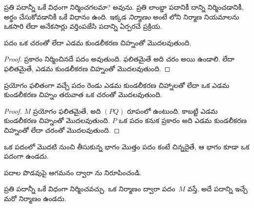 \documentclass[../../../include/open-logic-section]{subfiles}
\begin{document}

ప్రతి పదాన్నీ ఒకే విధంగా నిర్మించగలమా? అవును. ప్రతి లాంబ్డా పదానికీ
దాన్ని నిర్మించడానికీ, అర్థం చేసుకోవడానికీ ఒకే విధానం ఉంది. ఇక్కడ \emph{నిర్మాణం} అంటే
లోని నిర్మాణ నియమాలను ఒకసారి లేదా అనేకసార్లు
వర్తింపజేసి పదాన్ని ఏర్పరచే ప్రక్రియ.

\begin{lem}
పదం ఒక చరంతో లేదా ఎడమ కుండలీకరణ చిహ్నంతో మొదలవుతుంది.
\end{lem}

\begin{proof}
 ప్రకారం నిర్మించినదే పదం అవుతుంది.
 ఫలితమైతే అది చరం అయి ఉండాలి.
 లేదా  ఫలితమైతే,
ఎడమ కుండలీకరణ చిహ్నంతో మొదలవుతుంది.
\end{proof}

\begin{lem}
ప్రయోగం ఫలితంగా వచ్చే పదం రెండు ఎడమ కుండలీకరణ చిహ్నాలతో లేదా ఒక ఎడమ
కుండలీకరణ చిహ్నం తరువాత ఒక చరంతో మొదలవుతుంది.
\end{lem}

\begin{proof}
$M$ ప్రయోగం ఫలితమైతే, అది $(PQ)$ రూపంలో ఉంటుంది. కాబట్టి ఎడమ
కుండలీకరణ చిహ్నంతో మొదలవుతుంది. $P$ ఒక పదం కనుక
 ప్రకారం అది ఎడమ కుండలీకరణ చిహ్నంతో లేదా
చరంతో మొదలవుతుంది.
\end{proof}

\begin{lem}
ఒక పదంలో మొదటి నుంచి తీసుకున్న భాగం మొత్తం పదం కంటే చిన్నదైతే, ఆ భాగం కూడా ఒక పదంగా ఉండదు.
\end{lem}

\begin{prob}
పదాల పొడవుపై ఆగమనం ద్వారా
ను నిరూపించండి.
\end{prob}

\begin{prop}[ఏకార్థ పఠనీయత] 
ప్రతి పదాన్నీ ఒకే విధంగా నిర్మించవచ్చు. ఒక నిర్మాణం ద్వారా పదం~$M$
వస్తే, అదే పదాన్ని ఇచ్చే మరో నిర్మాణం ఉండదు.
\end{prop}
\end{document}
